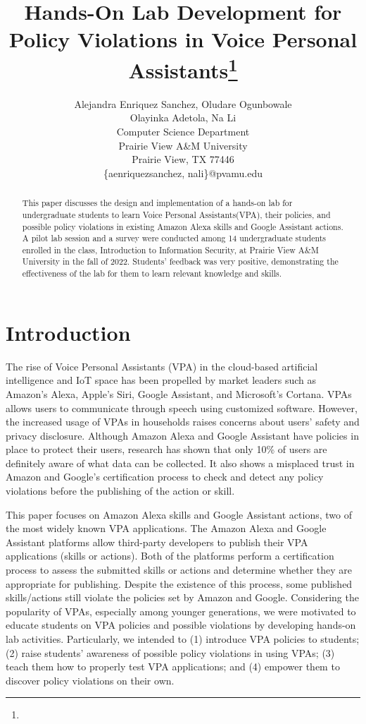 \documentclass{article}
\title{Hands-On Lab Development for Policy Violations in Voice Personal Assistants\footnote{\protect}
}
\author{
Alejandra Enriquez Sanchez, Oludare Ogunbowale \\
Olayinka Adetola, Na Li\\
Computer Science Department\\
Prairie View A\&M University \\
Prairie View, TX 77446\\
\email\{aenriquezsanchez, nali\}@pvamu.edu\\ 
}
\begin{document}
\maketitle

\begin{abstract}
This paper discusses the design and implementation of a hands-on lab for undergraduate students to learn Voice Personal Assistants(VPA), their policies, and possible policy violations in existing Amazon Alexa skills and Google Assistant actions. %
A pilot lab session and a survey were conducted among 14 undergraduate students enrolled in the class, Introduction to Information Security, at Prairie View A\&M University in the fall of 2022. Students' feedback was very positive, demonstrating the effectiveness of the lab for them to learn relevant knowledge and skills.  
\end{abstract}

\section{Introduction}
The rise of Voice Personal Assistants (VPA) in the cloud-based artificial intelligence and IoT space has been propelled by market leaders such as Amazon's Alexa, Apple's Siri, Google Assistant, and Microsoft's Cortana. VPAs allows users to communicate through speech using customized software. However, the increased usage of VPAs in households raises concerns about users' safety and privacy disclosure. Although Amazon Alexa and Google Assistant have policies in place to protect their users, research has shown that only 10\% of users are definitely aware of what data can be collected\cite{Cheng}. It also shows a misplaced trust in Amazon and Google's certification process to check and detect any policy violations before the publishing of the action or skill. 

This paper focuses on Amazon Alexa skills and Google Assistant actions, two of the most widely known VPA applications. The Amazon Alexa and Google Assistant platforms \cite{skillStore}\cite{actionStore} allow third-party developers to publish their VPA applications (skills or actions). Both of the platforms perform a certification process to assess the submitted skills or actions and determine whether they are appropriate for publishing. Despite the existence of this process, some published skills/actions still violate the policies set by Amazon and Google. Considering the popularity of VPAs, especially among younger generations, we were motivated to educate students on VPA policies and possible violations by developing hands-on lab activities. Particularly, we intended to (1) introduce VPA policies to students; (2) raise students' awareness of possible policy violations in using VPAs; (3) teach them how to properly test VPA applications; and (4) empower them to discover policy violations on their own.
\end{document}
